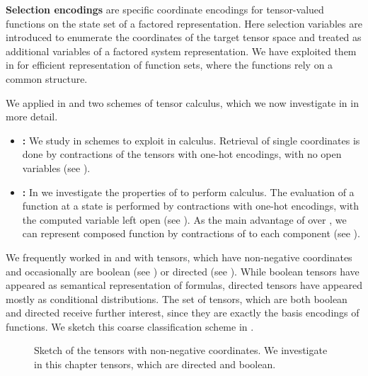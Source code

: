 \textbf{Selection encodings} are specific coordinate encodings for tensor-valued functions on the state set of a factored representation.
Here selection variables are introduced to enumerate the coordinates of the target tensor space and treated as additional variables of a factored system representation.
We have exploited them in  for efficient representation of function sets, where the functions rely on a common structure.


We applied in  and  two schemes of tensor calculus, which we now investigate in  in more detail.
\begin{itemize}
    \item \textbf{\CoordinateCalculus{}:} We study in  schemes to exploit \coordinateEncodings{} in calculus.
    Retrieval of single coordinates is done by contractions of the tensors with one-hot encodings, with no open variables (see ).
    \item \textbf{\BasisCalculus{}:} In  we investigate the properties of \basisEncodings{} to perform calculus.
    The evaluation of a function at a state is performed by contractions with one-hot encodings, with the computed variable left open (see ).
    As the main advantage of \basisEncodings{} over \coordinateEncodings{}, we can represent composed function by contractions of \basisEncodings{} to each component (see ).
\end{itemize}


We frequently worked in  and  with tensors, which have non-negative coordinates and occasionally are boolean (see ) or directed (see ).
While boolean tensors have appeared as semantical representation of formulas, directed tensors have appeared mostly as conditional distributions.
The set of tensors, which are both boolean and directed receive further interest, since they are exactly the basis encodings of functions.
We sketch this coarse classification scheme in .
\begin{figure}[h]
    \begin{center}
        
    \end{center}
    \caption{Sketch of the tensors with non-negative coordinates.
    We investigate in this chapter tensors, which are directed and boolean.}\label{fig:dbTensorSketch}
\end{figure}

